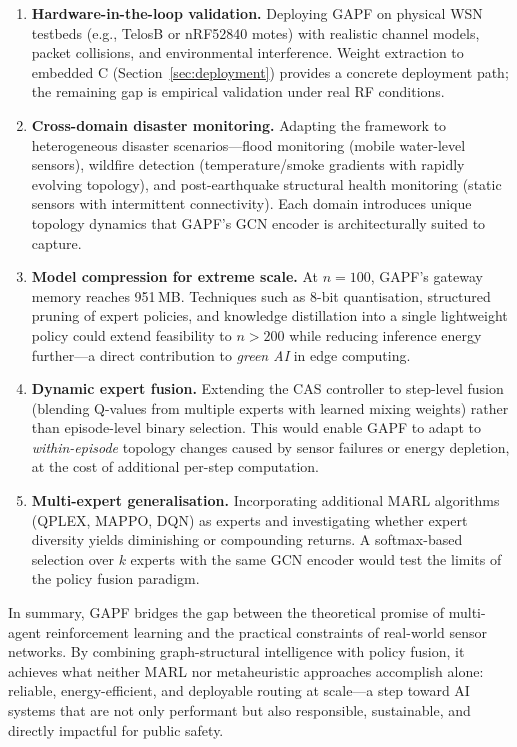 \documentclass[12pt, onecolumn, journal]{IEEEtran}
\begin{document}
\begin{enumerate}
    \item \textbf{Hardware-in-the-loop validation.} Deploying GAPF on physical WSN testbeds (e.g., TelosB or nRF52840 motes) with realistic channel models, packet collisions, and environmental interference. Weight extraction to embedded C (Section~\ref{sec:deployment}) provides a concrete deployment path; the remaining gap is empirical validation under real RF conditions.
    
    \item \textbf{Cross-domain disaster monitoring.} Adapting the framework to heterogeneous disaster scenarios---flood monitoring (mobile water-level sensors), wildfire detection (temperature/smoke gradients with rapidly evolving topology), and post-earthquake structural health monitoring (static sensors with intermittent connectivity). Each domain introduces unique topology dynamics that GAPF's GCN encoder is architecturally suited to capture.
    
    \item \textbf{Model compression for extreme scale.} At $n{=}100$, GAPF's gateway memory reaches 951\,MB. Techniques such as 8-bit quantisation, structured pruning of expert policies, and knowledge distillation into a single lightweight policy could extend feasibility to $n > 200$ while reducing inference energy further---a direct contribution to \emph{green AI} in edge computing.
    
    \item \textbf{Dynamic expert fusion.} Extending the CAS controller to step-level fusion (blending Q-values from multiple experts with learned mixing weights) rather than episode-level binary selection. This would enable GAPF to adapt to \emph{within-episode} topology changes caused by sensor failures or energy depletion, at the cost of additional per-step computation.
    
    \item \textbf{Multi-expert generalisation.} Incorporating additional MARL algorithms (QPLEX, MAPPO, DQN) as experts and investigating whether expert diversity yields diminishing or compounding returns. A softmax-based selection over $k$ experts with the same GCN encoder would test the limits of the policy fusion paradigm.
\end{enumerate}

\medskip
\noindent In summary, GAPF bridges the gap between the theoretical promise of multi-agent reinforcement learning and the practical constraints of real-world sensor networks. By combining graph-structural intelligence with policy fusion, it achieves what neither MARL nor metaheuristic approaches accomplish alone: reliable, energy-efficient, and deployable routing at scale---a step toward AI systems that are not only performant but also responsible, sustainable, and directly impactful for public safety.
\end{document}
